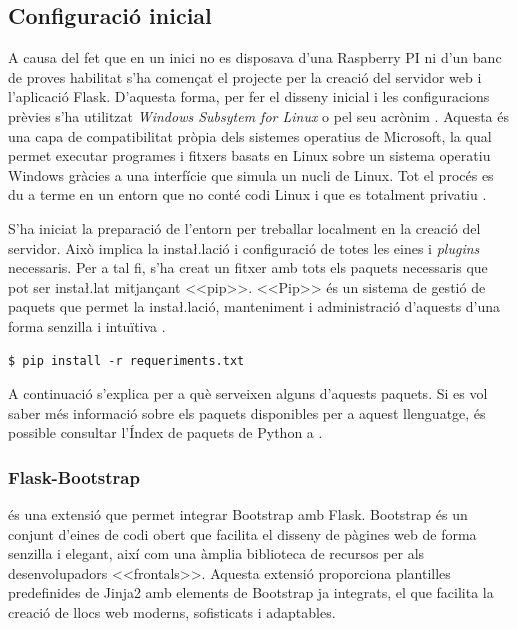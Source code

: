 \documentclass{tfgitic}[2022/06/30]
\begin{document}
\subsection{Configuració inicial}
A causa del fet que en un inici no es disposava d'una Raspberry PI ni d'un banc de proves habilitat s'ha començat el projecte per la creació del servidor web i l'aplicació Flask. D'aquesta forma, per fer el disseny inicial i les configuracions prèvies s'ha utilitzat \emph{Windows Subsytem for Linux} o  pel seu acrònim \cite{microsoft:wsl2}. Aquesta és una capa de compatibilitat pròpia dels sistemes operatius de Microsoft, la qual permet executar programes i fitxers basats en Linux sobre un sistema operatiu Windows gràcies a una interfície que simula un nucli de Linux. Tot el procés es du a terme en un entorn que no conté codi Linux i que es totalment privatiu \cite{mikegerwitz}.

S'ha iniciat la preparació de l'entorn per treballar localment en la creació del servidor. Això implica la insta\l.lació i configuració de totes les eines i \emph{plugins} necessaris. Per a tal fi, s'ha creat un fitxer  amb tots els paquets necessaris que pot ser insta\l.lat mitjançant <<pip>>. <<Pip>> és un sistema de gestió de paquets que permet la insta\l.lació, manteniment i administració d'aquests d'una forma senzilla i intuïtiva \cite{python:pip}.

\begin{lstlisting}[style = bash]
$ pip install -r requeriments.txt
\end{lstlisting}

A continuació s'explica per a què serveixen alguns d'aquests paquets. Si es vol saber més informació sobre els paquets disponibles per a aquest llenguatge, és possible consultar l'Índex de paquets de Python a \cite{python:PyPi}.

\subsubsection{Flask-Bootstrap}
 és una extensió que permet integrar Bootstrap amb Flask. Bootstrap és un conjunt d'eines de codi obert que facilita el disseny de pàgines web de forma senzilla i elegant, així com una àmplia biblioteca de recursos per als desenvolupadors <<frontals>>. Aquesta extensió proporciona plantilles predefinides de Jinja2 amb elements de Bootstrap ja integrats, el que facilita la creació de llocs web moderns, sofisticats i adaptables.
\end{document}
